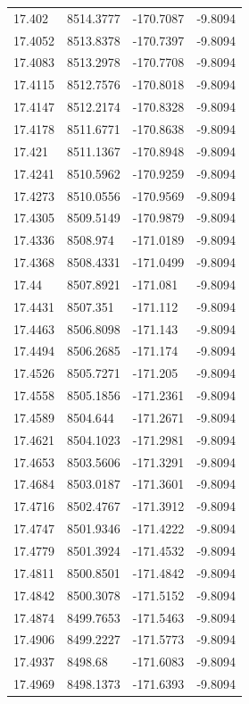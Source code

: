 \begin{table}[H]
\begin{tabular}{llll}
17.402 & 8514.3777 & -170.7087 & -9.8094 \\
17.4052 & 8513.8378 & -170.7397 & -9.8094 \\
17.4083 & 8513.2978 & -170.7708 & -9.8094 \\
17.4115 & 8512.7576 & -170.8018 & -9.8094 \\
17.4147 & 8512.2174 & -170.8328 & -9.8094 \\
17.4178 & 8511.6771 & -170.8638 & -9.8094 \\
17.421 & 8511.1367 & -170.8948 & -9.8094 \\
17.4241 & 8510.5962 & -170.9259 & -9.8094 \\
17.4273 & 8510.0556 & -170.9569 & -9.8094 \\
17.4305 & 8509.5149 & -170.9879 & -9.8094 \\
17.4336 & 8508.974 & -171.0189 & -9.8094 \\
17.4368 & 8508.4331 & -171.0499 & -9.8094 \\
17.44 & 8507.8921 & -171.081 & -9.8094 \\
17.4431 & 8507.351 & -171.112 & -9.8094 \\
17.4463 & 8506.8098 & -171.143 & -9.8094 \\
17.4494 & 8506.2685 & -171.174 & -9.8094 \\
17.4526 & 8505.7271 & -171.205 & -9.8094 \\
17.4558 & 8505.1856 & -171.2361 & -9.8094 \\
17.4589 & 8504.644 & -171.2671 & -9.8094 \\
17.4621 & 8504.1023 & -171.2981 & -9.8094 \\
17.4653 & 8503.5606 & -171.3291 & -9.8094 \\
17.4684 & 8503.0187 & -171.3601 & -9.8094 \\
17.4716 & 8502.4767 & -171.3912 & -9.8094 \\
17.4747 & 8501.9346 & -171.4222 & -9.8094 \\
17.4779 & 8501.3924 & -171.4532 & -9.8094 \\
17.4811 & 8500.8501 & -171.4842 & -9.8094 \\
17.4842 & 8500.3078 & -171.5152 & -9.8094 \\
17.4874 & 8499.7653 & -171.5463 & -9.8094 \\
17.4906 & 8499.2227 & -171.5773 & -9.8094 \\
17.4937 & 8498.68 & -171.6083 & -9.8094 \\
17.4969 & 8498.1373 & -171.6393 & -9.8094 \\

\end{tabular}
\end{table}
